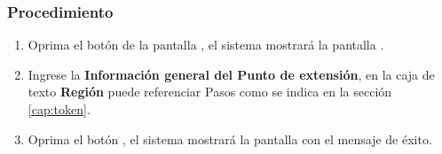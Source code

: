 \subsubsection*{Procedimiento}
\begin{enumerate}
	\item Oprima el botón  de la pantalla , el sistema mostrará la pantalla . 

	
	\item Ingrese la \textbf{Información general del Punto de extensión}, en la caja de texto \textbf{Región} puede referenciar Pasos como se indica en la sección \ref{cap:token}.
	
	\item Oprima el botón , el sistema mostrará la pantalla  con el mensaje de éxito.
\end{enumerate}

